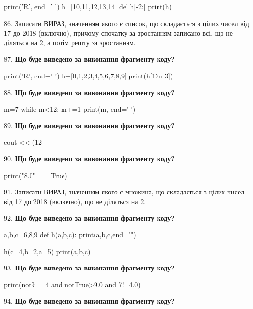 \documentclass[11pt]{article}
\begin{document}
print('R', end=' ')
h=[10,11,12,13,14]
del h[-2:]
print(h)

\par\vspace{5mm}
86. 
Записати ВИРАЗ, значенням якого є список, що складається з цілих чисел від 17 до 2018 (включно), причому спочатку за зростанням записано всі, що не діляться на 2, а потім решту за зростанням.\par\vspace{5mm}
87. \textbf{Що буде виведено за виконання фрагменту коду?}

print('R', end=' ')
h=[0,1,2,3,4,5,6,7,8,9]
print(h[13::-3])

\par\vspace{5mm}
88. \textbf{Що буде виведено за виконання фрагменту коду?}

m=7
while m<12:
    m+=1
print(m, end=' ')

\par\vspace{5mm}
89. \textbf{Що буде виведено за виконання фрагменту коду?}

cout << (12 %
\par\vspace{5mm}
90. \textbf{Що буде виведено за виконання фрагменту коду?}

print("8.0" == True)
\par\vspace{5mm}
91. 
Записати ВИРАЗ, значенням якого є множина, що складається з цілих чисел від 17 до 2018 (включно), що не діляться на 2.\par\vspace{5mm}
92. \textbf{Що буде виведено за виконання фрагменту коду?}

a,b,c=6,8,9
def h(a,b,c):
    print(a,b,c,end="")

h(c=4,b=2,a=5)
print(a,b,c)

\par\vspace{5mm}
93. \textbf{Що буде виведено за виконання фрагменту коду?}

print(not9==4 and notTrue>9.0 and 7!=4.0)
\par\vspace{5mm}
94. \textbf{Що буде виведено за виконання фрагменту коду?}
\end{document}
